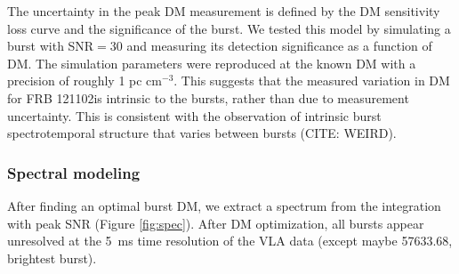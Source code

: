\documentclass[twocolumn]{aastex61}
\newcommand{\frb}{FRB 121102}
\begin{document}
The uncertainty in the peak DM measurement is defined by the DM sensitivity loss curve and the significance of the burst. We tested this model by simulating a burst with SNR$=30$ and measuring its detection significance as a function of DM. The simulation parameters were reproduced at the known DM with a precision of roughly 1 pc cm$^{-3}$. This suggests that the measured variation in DM for \frb is intrinsic to the bursts, rather than due to measurement uncertainty. This is consistent with the observation of intrinsic burst spectrotemporal structure that varies between bursts (CITE: WEIRD).


\subsubsection{Spectral modeling}
After finding an optimal burst DM, we extract a spectrum from the integration with peak SNR (Figure \ref{fig:spec}). After DM optimization, all bursts appear unresolved at the 5~ms time resolution of the VLA data (except maybe 57633.68, brightest burst). 
\end{document}
